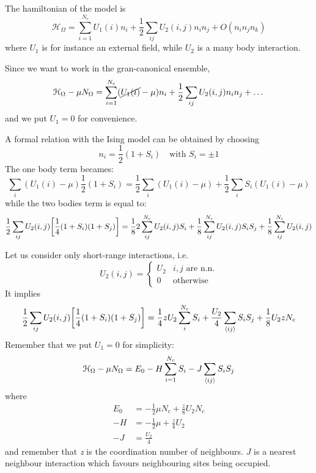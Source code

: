 \documentclass[../main/main.tex]{subfiles}
\begin{document}
The hamiltonian of the model is
\begin{equation}
  \mathcal{H}_ \Omega  = \sum_{i=1}^{N_c} U_1 (i) n_i + \frac{1}{2} \sum_{ij}^{} U_2 (i,j) n_i n_j + O (n_i n_j n_k)
\end{equation}
where \( U_1 \) is for instance an external field, while \( U_2 \) is a many body interaction.

Since we want to work in the gran-canonical ensemble,
\begin{equation}
  \mathcal{H}_ \Omega  - \mu N_ \Omega  = \sum_{i=1}^{N_c} ( \cancel{ U_1 (i)} - \mu) n_i + \frac{1}{2} \sum_{ij}^{} U_2 (i,j) n_i n_j +   \dots
\end{equation}
and we put \( U_1=0 \) for convenience.

A formal relation with the Ising model can be obtained by choosing
\begin{equation}
  n_i = \frac{1}{2} (1+S_i) \quad \text{with } S_i = \pm 1
\end{equation}
The one body term becames:
\begin{equation}
  \sum_{i}^{} (U_1 (i) - \mu )  \frac{1}{2} (1+S_i) = \frac{1}{2} \sum_{i}^{} (U_1 (i) - \mu ) + \frac{1}{2} \sum_{i}^{} S_i (U_1 (i) - \mu )
\end{equation}
while the two bodies term is equal to:
\begin{equation}
  \frac{1}{2} \sum_{ij}^{} U_2 (i,j) \qty[\frac{1}{4} (1+S_i)(1+S_j)] = \frac{1}{8} 2 \sum_{ij}^{N_c} U_2 (i,j) S_i + \frac{1}{8}  \sum_{ij}^{N_c} U_2 (i,j) S_i S_j + \frac{1}{8} \sum_{ij}^{N_c} U_2 (i,j)
\end{equation}

Let us consider only short-range interactions, i.e.
\begin{equation}
U_2 (i,j) =
  \begin{cases}
   U_2 & i,j \text{ are n.n.}\\
   0 & \text{otherwise}
  \end{cases}
\end{equation}
It implies
\begin{equation}
    \frac{1}{2} \sum_{ij}^{} U_2 (i,j) \qty[\frac{1}{4} (1+S_i)(1+S_j)] =
      \frac{1}{4} z U_2 \sum_{i}^{N_c} S_i + \frac{U_2}{4} \sum_{\expval{ij} }^{} S_i S_j + \frac{1}{8} U_2 z N_c
\end{equation}
Remember that we put \( U_1 = 0 \) for simplicity:
\begin{equation}
    \mathcal{H}_ \Omega  - \mu N_ \Omega   =  E_0 - H \sum_{i=1}^{N_c} S_i - J \sum_{\expval{ij} }^{} S_i S_j
\end{equation}
where
\begin{subequations}
\begin{align}
     E_0 & = - \frac{1}{2} \mu N_c + \frac{z}{8} U_2 N_c \\
       -H &= - \frac{1}{2} \mu + \frac{z}{4} U_2 \\
         -J & = \frac{U_2}{4}
\end{align}
\end{subequations}
and remember that \emph{z} is the coordination number of neighbours.
 \( J \) is a nearest neighbour interaction which favours neighbouring sites being occupied.
\end{document}
